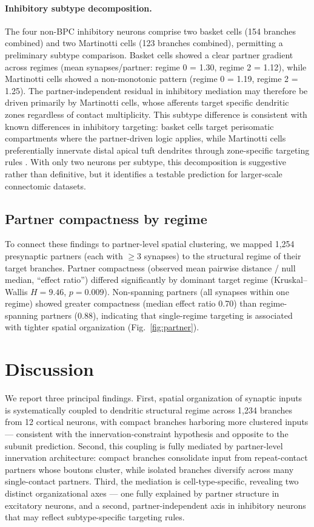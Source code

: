 \documentclass[11pt]{article}
\begin{document}
\paragraph{Inhibitory subtype decomposition.}
The four non-BPC inhibitory neurons comprise two basket cells (154 branches combined) and two Martinotti cells (123 branches combined), permitting a preliminary subtype comparison. Basket cells showed a clear partner gradient across regimes (mean synapses/partner: regime 0 = 1.30, regime 2 = 1.12), while Martinotti cells showed a non-monotonic pattern (regime 0 = 1.19, regime 2 = 1.25). The partner-independent residual in inhibitory mediation may therefore be driven primarily by Martinotti cells, whose afferents target specific dendritic zones regardless of contact multiplicity. This subtype difference is consistent with known differences in inhibitory targeting: basket cells target perisomatic compartments where the partner-driven logic applies, while Martinotti cells preferentially innervate distal apical tuft dendrites through zone-specific targeting rules \citep{larkum2009}. With only two neurons per subtype, this decomposition is suggestive rather than definitive, but it identifies a testable prediction for larger-scale connectomic datasets.

\subsection{Partner compactness by regime}

To connect these findings to partner-level spatial clustering, we mapped 1,254 presynaptic partners (each with $\geq 3$ synapses) to the structural regime of their target branches. Partner compactness (observed mean pairwise distance / null median, ``effect ratio'') differed significantly by dominant target regime (Kruskal--Wallis $H = 9.46$, $p = 0.009$). Non-spanning partners (all synapses within one regime) showed greater compactness (median effect ratio 0.70) than regime-spanning partners (0.88), indicating that single-regime targeting is associated with tighter spatial organization (Fig.~\ref{fig:partner}).

\section{Discussion}

We report three principal findings. First, spatial organization of synaptic inputs is systematically coupled to dendritic structural regime across 1,234 branches from 12 cortical neurons, with compact branches harboring more clustered inputs --- consistent with the innervation-constraint hypothesis and opposite to the subunit prediction. Second, this coupling is fully mediated by partner-level innervation architecture: compact branches consolidate input from repeat-contact partners whose boutons cluster, while isolated branches diversify across many single-contact partners. Third, the mediation is cell-type-specific, revealing two distinct organizational axes --- one fully explained by partner structure in excitatory neurons, and a second, partner-independent axis in inhibitory neurons that may reflect subtype-specific targeting rules.
\end{document}
